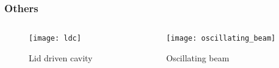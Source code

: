 \begin{frame}
    \frametitle{Others}
    \begin{columns}[onlytextwidth]
        \begin{column}{0.5\textwidth}
            \begin{figure}[ht]
                \centering
                \texttt{[image: ldc]}
                \caption{Lid driven cavity}
            \end{figure}
        \end{column}
        \begin{column}{0.5\textwidth}
            \begin{figure}[ht]
                \centering
                \texttt{[image: oscillating\_beam]}
                \caption{Oscillating beam}
            \end{figure}
        \end{column}
    \end{columns}
\end{frame}
